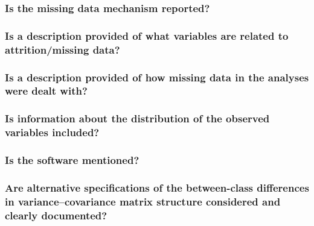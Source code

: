 \documentclass[man]{apa6}
\begin{document}
\hypertarget{is-the-missing-data-mechanism-reported}{%
\subsubsection{Is the missing data mechanism reported?}\label{is-the-missing-data-mechanism-reported}}

\hypertarget{is-a-description-provided-of-what-variables-are-related-to-attritionmissing-data}{%
\subsubsection{Is a description provided of what variables are related to attrition/missing data?}\label{is-a-description-provided-of-what-variables-are-related-to-attritionmissing-data}}

\hypertarget{is-a-description-provided-of-how-missing-data-in-the-analyses-were-dealt-with}{%
\subsubsection{Is a description provided of how missing data in the analyses were dealt with?}\label{is-a-description-provided-of-how-missing-data-in-the-analyses-were-dealt-with}}

\hypertarget{is-information-about-the-distribution-of-the-observed-variables-included}{%
\subsubsection{Is information about the distribution of the observed variables included?}\label{is-information-about-the-distribution-of-the-observed-variables-included}}

\hypertarget{is-the-software-mentioned}{%
\subsubsection{Is the software mentioned?}\label{is-the-software-mentioned}}

\hypertarget{are-alternative-specifications-of-the-between-class-differences-in-variancecovariance-matrix-structure-considered-and-clearly-documented}{%
\subsubsection{Are alternative specifications of the between-class differences in variance--covariance matrix structure considered and clearly documented?}\label{are-alternative-specifications-of-the-between-class-differences-in-variancecovariance-matrix-structure-considered-and-clearly-documented}}
\end{document}
